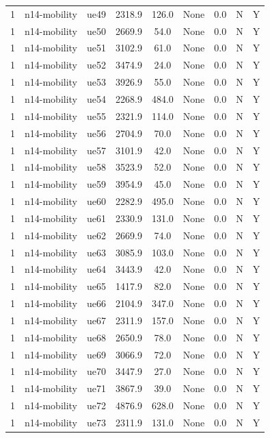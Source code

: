 \begin{table}[ht]
\begin{tabular}{|c|c|c|c|c|c|c|c|c|}
1 & n14-mobility & ue49 & 2318.9 & 126.0 & None & 0.0 & N & Y \\
1 & n14-mobility & ue50 & 2669.9 & 54.0 & None & 0.0 & N & Y \\
1 & n14-mobility & ue51 & 3102.9 & 61.0 & None & 0.0 & N & Y \\
1 & n14-mobility & ue52 & 3474.9 & 24.0 & None & 0.0 & N & Y \\
1 & n14-mobility & ue53 & 3926.9 & 55.0 & None & 0.0 & N & Y \\
1 & n14-mobility & ue54 & 2268.9 & 484.0 & None & 0.0 & N & Y \\
1 & n14-mobility & ue55 & 2321.9 & 114.0 & None & 0.0 & N & Y \\
1 & n14-mobility & ue56 & 2704.9 & 70.0 & None & 0.0 & N & Y \\
1 & n14-mobility & ue57 & 3101.9 & 42.0 & None & 0.0 & N & Y \\
1 & n14-mobility & ue58 & 3523.9 & 52.0 & None & 0.0 & N & Y \\
1 & n14-mobility & ue59 & 3954.9 & 45.0 & None & 0.0 & N & Y \\
1 & n14-mobility & ue60 & 2282.9 & 495.0 & None & 0.0 & N & Y \\
1 & n14-mobility & ue61 & 2330.9 & 131.0 & None & 0.0 & N & Y \\
1 & n14-mobility & ue62 & 2669.9 & 74.0 & None & 0.0 & N & Y \\
1 & n14-mobility & ue63 & 3085.9 & 103.0 & None & 0.0 & N & Y \\
1 & n14-mobility & ue64 & 3443.9 & 42.0 & None & 0.0 & N & Y \\
1 & n14-mobility & ue65 & 1417.9 & 82.0 & None & 0.0 & N & Y \\
1 & n14-mobility & ue66 & 2104.9 & 347.0 & None & 0.0 & N & Y \\
1 & n14-mobility & ue67 & 2311.9 & 157.0 & None & 0.0 & N & Y \\
1 & n14-mobility & ue68 & 2650.9 & 78.0 & None & 0.0 & N & Y \\
1 & n14-mobility & ue69 & 3066.9 & 72.0 & None & 0.0 & N & Y \\
1 & n14-mobility & ue70 & 3447.9 & 27.0 & None & 0.0 & N & Y \\
1 & n14-mobility & ue71 & 3867.9 & 39.0 & None & 0.0 & N & Y \\
1 & n14-mobility & ue72 & 4876.9 & 628.0 & None & 0.0 & N & Y \\
1 & n14-mobility & ue73 & 2311.9 & 131.0 & None & 0.0 & N & Y \\

\end{tabular}
\end{table}
